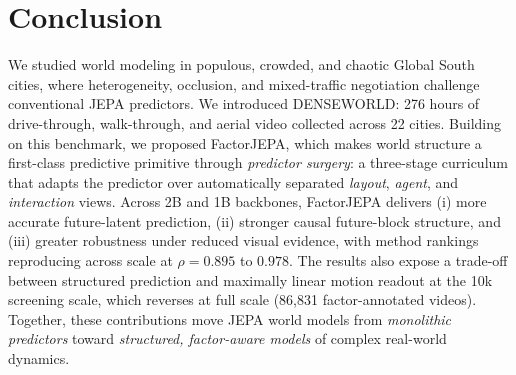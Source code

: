 \section{Conclusion}

We studied world modeling in populous, crowded, and chaotic Global
South cities, where heterogeneity, occlusion, and mixed-traffic negotiation
challenge conventional JEPA predictors. We introduced DENSEWORLD:
276 hours of drive-through, walk-through, and aerial video collected
across 22 cities. Building on this benchmark, we proposed
FactorJEPA, which makes world structure a
first-class predictive primitive through \emph{predictor surgery}: a
three-stage curriculum that adapts the predictor over automatically separated
\emph{layout}, \emph{agent}, and \emph{interaction}
views. Across 2B and 1B backbones, FactorJEPA delivers (i) more
accurate future-latent prediction, (ii) stronger causal
future-block structure, and (iii) greater robustness under
reduced visual evidence, with method rankings reproducing across scale at
$\rho=0.895$ to $0.978$. The results also expose a trade-off between structured
prediction and maximally linear motion readout at the 10k screening scale,
which reverses at full scale (86,831 factor-annotated videos). Together, these
contributions move JEPA world
models from \emph{monolithic predictors} toward
\emph{structured, factor-aware models} of complex real-world dynamics.
